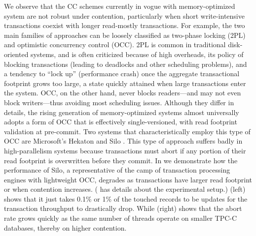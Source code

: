 We observe that the CC schemes currently in vogue with memory-optimized system are not robust under contention, particularly when short write-intensive transactions coexist with longer read-mostly transactions.
For example, the two main families of approaches can be loosely classified as two-phase locking (2PL) and optimistic concurrency control (OCC). 2PL is common in traditional disk-oriented systems, and is often criticized because of high overheads, its policy of blocking transactions (leading to deadlocks and other scheduling problems), and a tendency to ``lock up'' (performance crash) once the aggregate transactional footprint grows too large, a state quickly attained when large transactions enter the system. OCC, on the other hand, never blocks readers---and may not even block writers---thus avoiding most scheduling issues. Although they differ in details, the rising generation of memory-optimized systems almost universally adopts a form of OCC that is effectively single-versioned, with read footprint validation at pre-commit.  Two systems that characteristically employ this type of OCC are Microsoft's Hekaton \cite{LarsonBDFPZ11} and Silo \cite{TuZKLM13}. This type of approach suffers badly in high-parallelism systems \cite{YuBPDS14} because transactions must abort if any portion of their read footprint is overwritten before they commit. 
In  we demonstrate how the performance of Silo, a representative of the camp of transaction processing engines with lightweight OCC, degrades as transactions have larger read footprint or when contention increases. ( has details about the experimental setup.) (left) shows that it just takes 0.1\% or 1\% of the touched records to be updates for the transaction throughput to drastically drop. While (right) shows that the abort rate grows quickly as the same number of threads operate on smaller TPC-C databases, thereby on higher contention.

